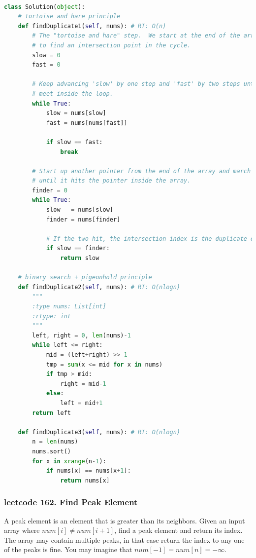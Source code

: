 \documentclass[a4paper,10pt]{article}
\begin{document}
\begin{lstlisting}[language=Python, caption=Problem287. Find the Duplicate Number]

class Solution(object):
    # tortoise and hare principle
    def findDuplicate1(self, nums): # RT: O(n)
        # The "tortoise and hare" step.  We start at the end of the array and try
        # to find an intersection point in the cycle.
        slow = 0
        fast = 0
    
        # Keep advancing 'slow' by one step and 'fast' by two steps until they
        # meet inside the loop.
        while True:
            slow = nums[slow]
            fast = nums[nums[fast]]
    
            if slow == fast:
                break
    
        # Start up another pointer from the end of the array and march it forward
        # until it hits the pointer inside the array.
        finder = 0
        while True:
            slow   = nums[slow]
            finder = nums[finder]
    
            # If the two hit, the intersection index is the duplicate element.
            if slow == finder:
                return slow
    
    # binary search + pigeonhold principle
    def findDuplicate2(self, nums): # RT: O(nlogn)
        """
        :type nums: List[int]
        :rtype: int
        """
        left, right = 0, len(nums)-1
        while left <= right:
            mid = (left+right) >> 1
            tmp = sum(x <= mid for x in nums)
            if tmp > mid:
                right = mid-1
            else:
                left = mid+1
        return left
    
    def findDuplicate3(self, nums): # RT: O(nlogn)
        n = len(nums)
        nums.sort()
        for x in xrange(n-1):
            if nums[x] == nums[x+1]:
                return nums[x]
\end{lstlisting}


\subsubsection{leetcode 162. Find Peak Element}
A peak element is an element that is greater than its neighbors. Given an input array where $num[i] \neq num[i+1]$, find a peak element and return its index. \\

\noindent The array may contain multiple peaks, in that case return the index to any one of the peaks is fine. You may imagine that $num[-1] = num[n] = -\infty$.
\end{document}
